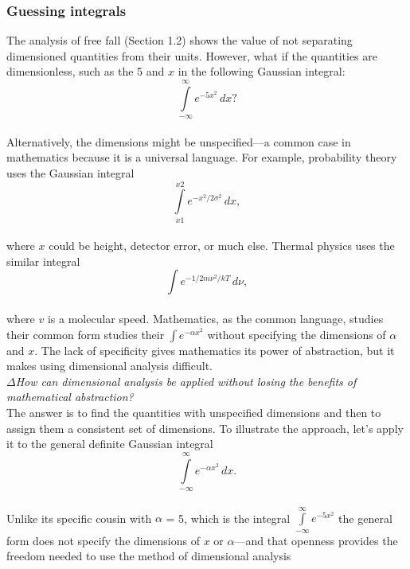 \documentclass[a4paper]{article}
\numberwithin{equation}{section}
\begin{document}
\subsubsection{Guessing integrals}

The analysis of free fall (Section 1.2) shows the value of not separating
dimensioned quantities from their units. However, what if the quantities
are dimensionless, such as the 5 and $x$ in the following Gaussian integral:
\\

\begin{equation}
\int\limits_{-\infty}^{\infty} e^{-5x^2}\,dx?
\end{equation}
\\
Alternatively, the dimensions might be unspecified—a common case in
mathematics because it is a universal language. For example, probability
theory uses the Gaussian integral
\\

\begin{equation}
\int\limits_{x1}^{x2} e^{-x^2/2\sigma^2}\,dx,
\end{equation}
\\
where $x$ could be height, detector error, or much else. Thermal physics
uses the similar integral
\\

\begin{equation}
\int e^{-1/2m\nu^2/kT}\,d\nu,
\end{equation}
\\
where $v$ is a molecular speed. Mathematics, as the common language,
studies their common form studies their $\int e^{-\alpha x^2}$ without specifying the dimensions of
$\alpha$ and $x$. The lack of specificity gives mathematics its power of abstraction,
but it makes using dimensional analysis difficult.
\\

$\Delta$\textit {How can dimensional analysis be applied without losing the benefits of mathematical
abstraction?}
\\

The answer is to find the quantities with unspecified dimensions and then
to assign them a consistent set of dimensions. To illustrate the approach,
let’s apply it to the general definite Gaussian integral
\\

\begin{equation}
\int\limits_{-\infty}^{\infty} e^{-\alpha x^2}\,dx.
\end{equation}
\\
Unlike its specific cousin with $\alpha$ = 5, which is the integral $\int\limits_{-\infty}^{\infty} e^{-5x^2}$ the general form does not specify the dimensions of $x$ or $\alpha$—and that
openness provides the freedom needed to use the method of dimensional
analysis
\\
\end{document}
